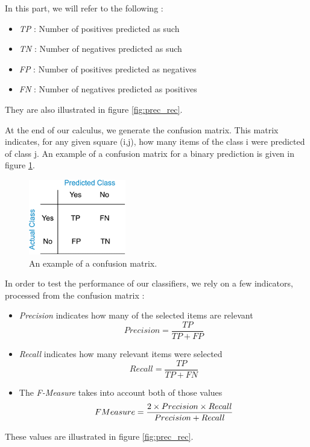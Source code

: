 \label{lab:ana}
In this part, we will refer to the following : 
\begin{itemize}
	\item \emph{TP} : Number of positives predicted as such
	\item \emph{TN} : Number of negatives predicted as such
	\item \emph{FP} : Number of positives predicted as negatives
	\item \emph{FN} : Number of negatives predicted as positives
\end{itemize}
They are also illustrated in figure \ref{fig:prec_rec}.

At the end of our calculus, we generate the confusion matrix.
This matrix indicates, for any given square (i,j), how many items of the class i were predicted of class j.
An example of a confusion matrix for a binary prediction is given in figure \ref{fig:confusion}.

\begin{figure}[!h]
\centering
\includegraphics[width=.3\textwidth]{Images/confusion.png}
\caption{An example of a confusion matrix.}
\label{fig:confusion}
\end{figure}


In order to test the performance of our classifiers, we rely on a few indicators, processed from the confusion matrix :
\begin{itemize}
	\item \emph{Precision} indicates how many of the selected items are relevant
		\begin{equation*}
		Precision = \frac{TP}{TP+FP}
		\end{equation*}
	\item \emph{Recall} indicates how many relevant items were selected 
		\begin{equation*}
		Recall = \frac{TP}{TP+FN}
		\end{equation*}
	\item The \emph{F-Measure} takes into account both of those values
		\begin{equation*}
		F\-Measure = \frac{2\times Precision\times Recall}{Precision + Recall}
		\end{equation*}
\end{itemize}
These values are illustrated in figure \ref{fig:prec_rec}.

